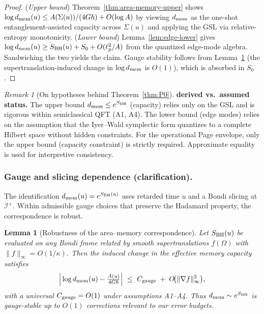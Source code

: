 \documentclass[aps,prd,preprint,onecolumn,superscriptaddress,nofootinbib,longbibliography,floatfix,11pt,showpacs,showkeys]{revtex4-2}
\theoremstyle{plain}
\newtheorem{lemma}[theorem]{Lemma}
\theoremstyle{definition}
\theoremstyle{remark}
\newtheorem{remark}[theorem]{Remark}
\begin{document}
\begin{proof}
(\emph{Upper bound}) Theorem~\ref{thm:area-memory-upper} shows $\log d_{\rm mem}(u)\le A(\Sigma(u))/(4G\hbar)+O(\log A)$ by viewing $d_{\rm mem}$ as the one-shot entanglement-assisted capacity across $\Sigma(u)$ and applying the GSL via relative-entropy monotonicity.
(\emph{Lower bound}) Lemma~\ref{lem:edge-lower} gives $\log d_{\rm mem}(u)\ge S_{\rm BH}(u)+S_0+O(\ell_p^2/A)$ from the quantized edge-mode algebra.
Sandwiching the two yields the claim. Gauge stability follows from Lemma~\ref{lem:gauge-robustness} (the supertranslation-induced change in $\log d_{\rm mem}$ is $O(1)$), which is absorbed in $S_0$.
\end{proof}

\begin{remark}[On hypotheses behind Theorem~\ref{thm:P0}]\label{rem:P0-hypotheses}
\textbf{derived vs.\ assumed status.} The upper bound $d_{\rm mem} \le e^{S_{\rm BH}}$ (capacity) relies only on the GSL and is rigorous within semiclassical QFT (A1, A4).
The lower bound (edge modes) relies on the assumption that the Iyer--Wald symplectic form quantizes to a complete Hilbert space without hidden constraints.
For the operational Page envelope, only the upper bound (capacity constraint) is strictly required.
Approximate equality is used for interpretive consistency.
\end{remark}

\subsubsection{Gauge and slicing dependence (clarification).}
The identification \(d_{\rm mem}(u)=e^{S_{\rm BH}(u)}\) uses retarded time \(u\) and a Bondi slicing at \(\mathcal{I}^+\).
Within admissible gauge choices that preserve the Hadamard property, the correspondence is robust.

\begin{lemma}[Robustness of the area--memory correspondence]\label{lem:gauge-robustness}
Let \(S_{\rm BH}(u)\) be evaluated on any Bondi frame related by smooth supertranslations \(f(\Omega)\) with \(\|f\|_\infty=O(1/\kappa)\).
Then the induced change in the effective memory capacity satisfies
\[
\Big|\log d_{\rm mem}(u)-\tfrac{A(u)}{4G\hbar}\Big|\ \le\ C_{\rm gauge}\;+\;O\!\big(\|\nabla f\|_\infty^2\big),
\]
with a universal \(C_{\rm gauge}=O(1)\) under assumptions A1--A4.
Thus \(d_{\rm mem}\sim e^{S_{\rm BH}}\) is gauge-stable up to \(O(1)\) corrections relevant to our error budgets.
\end{lemma}
\end{document}
